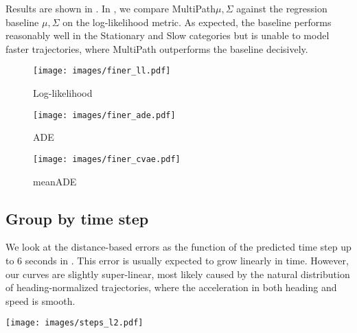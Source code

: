 \documentclass{article}
\newcommand{\multiflow}{MultiPath\xspace}
\begin{document}
Results are shown in . In , we compare \multiflow $\mu,\Sigma$ against the regression baseline $\mu,\Sigma$ on the log-likelihood metric. As expected, the baseline performs reasonably well in the Stationary and Slow categories but is unable to model faster trajectories, where \multiflow outperforms the baseline decisively.


\begin{figure*}[!htbp]
\centering
  \begin{subfigure}[b]{0.49\textwidth}
    \texttt{[image: images/finer\_ll.pdf]}
    \caption{Log-likelihood}
    \label{fig:finer_ll}
  \end{subfigure}
  \begin{subfigure}[b]{0.49\textwidth}
    \texttt{[image: images/finer\_ade.pdf]}
    \caption{ADE}
    \label{fig:finer_ade}
  \end{subfigure}
  \begin{subfigure}[b]{0.49\textwidth}
    \texttt{[image: images/finer\_cvae.pdf]}
    \caption{meanADE}
    \label{fig:finer_cvae}
  \end{subfigure}  
\caption{
Detailed results grouped by the groundtruth final waypoint. (a): Detailed comparison between \multiflow $\mu,\Sigma$ and the regression $\mu,\Sigma$ baseline on the log-likelihood. (b): Detailed comparison between \multiflow $\mu$ and the regression $\mu$ baseline on the ADE. Detailed comparison between \multiflow $\mu$ and the CVAE baseline on the meanADE. The top 5 trajectories are kept for \multiflow, and 100000 trajectories are sampled from the CVAE.
}
\label{fig:finer}
\end{figure*}


\subsection{Group by time step}

We look at the distance-based errors as the function of the predicted time step up to 6 seconds in . This error is usually expected to grow linearly in time. However, our curves are slightly super-linear, most likely caused by the natural distribution of heading-normalized trajectories, where the acceleration in both heading and speed is smooth.

\begin{figure*}[!htbp]
\centering
\texttt{[image: images/steps\_l2.pdf]}
\caption{
Detailed results from \multiflow $\mu$ grouped by time step on the ADE and minADE$_{5}$ metrics.
}
\label{fig:steps_l2}
\end{figure*}
\end{document}

